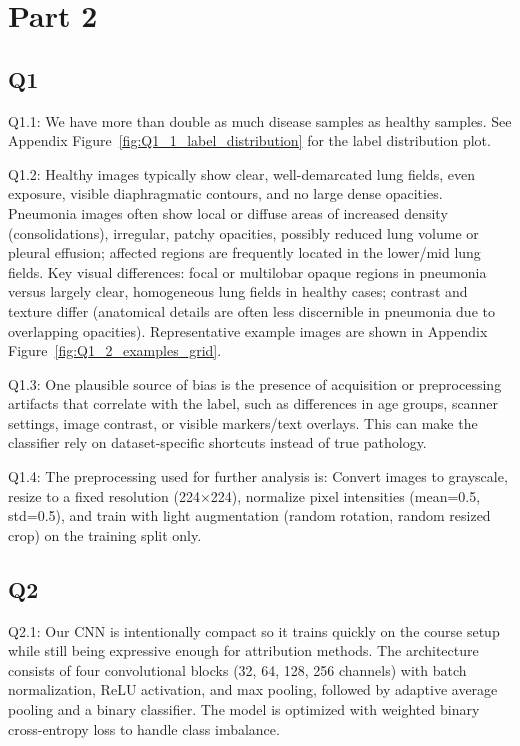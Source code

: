 \section*{Part 2}
\subsection*{Q1}
Q1.1: We have more than double as much disease samples as healthy samples. See Appendix Figure~\ref{fig:Q1_1_label_distribution} for the label distribution plot.

Q1.2: Healthy images typically show clear, well-demarcated lung fields, even exposure, visible diaphragmatic contours, and no large dense opacities. Pneumonia images often show local or diffuse areas of increased density (consolidations), irregular, patchy opacities, possibly reduced lung volume or pleural effusion; affected regions are frequently located in the lower/mid lung fields. Key visual differences: focal or multilobar opaque regions in pneumonia versus largely clear, homogeneous lung fields in healthy cases; contrast and texture differ (anatomical details are often less discernible in pneumonia due to overlapping opacities). Representative example images are shown in Appendix Figure~\ref{fig:Q1_2_examples_grid}.

Q1.3: One plausible source of bias is the presence of acquisition or preprocessing artifacts that correlate with the label, such as differences in age groups, scanner settings, image contrast, or visible markers/text overlays. This can make the classifier rely on dataset-specific shortcuts instead of true pathology.

Q1.4: The preprocessing used for further analysis is: Convert images to grayscale, resize to a fixed resolution (224×224), normalize pixel intensities (mean=0.5, std=0.5), and train with light augmentation (random rotation, random resized crop) on the training split only.

\subsection*{Q2}
Q2.1: Our CNN is intentionally compact so it trains quickly on the course setup while still being expressive enough for attribution methods. The architecture consists of four convolutional blocks (32, 64, 128, 256 channels) with batch normalization, ReLU activation, and max pooling, followed by adaptive average pooling and a binary classifier. The model is optimized with weighted binary cross-entropy loss to handle class imbalance.

